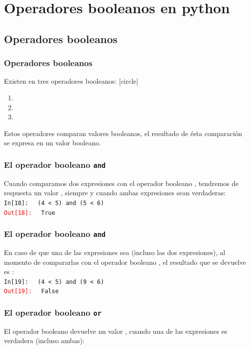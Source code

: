 {\section{Operadores booleanos en python}
\subsection{Operadores booleanos}
\begin{frame}
\frametitle{Operadores booleanos}
Existen en \python{} tres operadores booleanos:
[circle]
\begin{enumerate}[<+->]
\item {}
\item {}
\item {}
\end{enumerate}
\pause
Estos operadores comparan valores booleanos, el resultado de ésta comparación se expresa en un valor booleano.
\end{frame}
\begin{frame}[fragile]
\frametitle{El operador booleano \texttt{and}}
Cuando comparamos dos expresiones con el operador booleano , tendremos de respuesta un valor , siempre y cuando ambas expresiones sean verdaderas:
\\
\bigskip
\pause
\textcolor{ao}{\texttt{In[18]: }} \verb| (4 < 5) and (5 < 6)| \\
\pause
\textcolor{red}{\texttt{Out[18]: }} \verb| True|
\end{frame}
\begin{frame}[fragile]
\frametitle{El operador booleano \texttt{and}}
En caso de que una de las expresiones sea  (incluso las dos expresiones), al momento de compararlas con el operador booleano , el resultado que se devuelve es :
\\
\bigskip
\pause
\textcolor{ao}{\texttt{In[19]: }} \verb| (4 < 5) and (9 < 6)| \\
\pause
\textcolor{red}{\texttt{Out[19]: }} \verb| False|
\end{frame}
\begin{frame}[fragile]
\frametitle{El operador booleano \texttt{or}}
El operador booleano  devuelve un valor , cuando una de las expresiones es verdadera (incluso ambas):
\\

\end{frame}}
